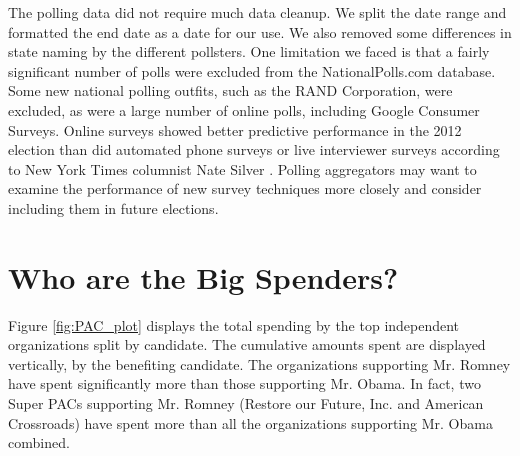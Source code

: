 \documentclass[11pt]{article}\usepackage{graphicx, color}
\begin{document}
The polling data did not require much data cleanup. We split the date range and formatted the end date as a date for our use. We also removed some differences in state naming by the different pollsters. One limitation we faced is that a fairly significant number of polls were excluded from the NationalPolls.com database. Some new national polling outfits, such as the RAND Corporation, were excluded, as were a large number of online polls, including Google Consumer Surveys. Online surveys showed better predictive performance in the 2012 election than did automated phone surveys or live interviewer surveys according to New York Times columnist Nate Silver \cite{ns-polls}. Polling aggregators may want to examine the performance of new survey techniques more closely and consider including them in future elections.


\section{Who are the Big Spenders?}
% 

Figure \ref{fig:PAC_plot} displays the total spending by the top independent organizations split by candidate. The cumulative amounts spent are displayed vertically, by the benefiting candidate. The organizations supporting Mr. Romney have spent significantly more than those supporting Mr. Obama. In fact, two Super PACs supporting Mr. Romney (Restore our Future, Inc. and American Crossroads) have spent more than all the organizations supporting Mr. Obama combined.
\end{document}
